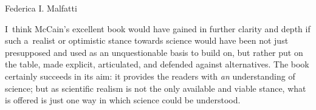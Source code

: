 \begin{recengenv}{Federica I. Malfatti}
\enlargethispage{2\baselineskip}

I~think McCain's excellent book would have gained in further clarity and depth if such a~realist or optimistic stance towards science would have been not just presupposed and used as an unquestionable basis to build on, but rather put on the table, made explicit, articulated, and defended against alternatives. The book certainly succeeds in its aim: it provides the readers with \textit{an} understanding of science; but as scientific realism is not the only available and viable stance, what is offered is just one way in which science could be understood.



\end{recengenv}
